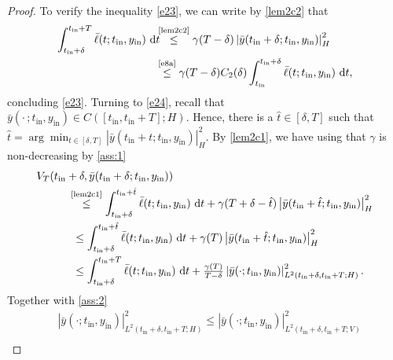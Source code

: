 \documentclass{m2an}
\newcommand{\argmin}{\arg\!\min}
\newcommand{\dt}{\mathrm{d}t}
\newcommand{\tint}{t_{\mathrm{in}}}
\newcommand{\yint}{y_{\mathrm{in}}}
\newcommand{\norm}[2]{\left|#1\right|_{#2}}
\providecommand{\argmin}{\operatorname*{argmin}}
\begin{document}
\begin{proof}
    To verify the inequality \eqref{e23}, we can write by \eqref{lem2c2} that 
    \begin{equation}
        \begin{split}
            \int^{ \tint+T}_{\tint+\delta} \bar \ell(t;\tint, \yint)\ \dt  &\hspace{-1.5mm}   \stackrel{\text{\eqref{lem2c2}}}{\leq} 
            \gamma(T-\delta) \norm{\bar y(\tint+\delta;\tint, \yint)}{H}^2 \\
            &\hspace{-1.5mm}   \stackrel{\text{\eqref{e8a}}}{\leq} \gamma(T-\delta)C_2(\delta) \int_{ \tint}^{\tint+\delta} \bar \ell(t;\tint, \yint)\ \dt,
        \end{split}
    \end{equation}
    concluding \eqref{e23}. Turning to \eqref{e24}, recall that $ \bar y(\cdot\,;\tint, \yint) \in C([\tint,\tint+T];H)$. Hence, there is a $\hat{t}\in [\delta, T]$ such that $\hat{t}= \argmin_{t \in [\delta, T]}  \norm{\bar y(\tint+t ;\tint, \yint)}{H}^2$. By \eqref{lem2c1}, we have using that $\gamma$ is non-decreasing by \cref{ass:1}
    \begin{equation}
        \label{e15}
        \begin{split}
        &V_T( \tint+\delta, \bar y(\tint+\delta; \tint, \yint))\\
        &\hspace{10mm}\stackrel{\text{\eqref{lem2c1}}}{\leq}\int^{\tint+\hat{t}}_{\tint+\delta} \bar \ell(t; \tint, \yint)\ \dt+\gamma(T+\delta-\hat{t}) \norm{ \bar y(\tint+\hat{t}; \tint, \yint)}{H}^2\\
        &\hspace{11.5mm}\leq \int^{\tint+\hat{t}}_{ \tint+\delta} \bar \ell(t;\tint, \yint)\ \dt+\gamma(T)\norm{\bar y(\tint+\hat t;\tint, \yint)}{H}^2\\
        &\hspace{11.5mm}\leq \int^{\tint+T}_{\tint+\delta} \bar \ell(t;\tint, \yint)\ \dt+\tfrac{\gamma(T)}{T-\delta}\norm{\bar y(\cdot;\tint, \yint)}{L^2(\tint+\delta,\tint+T;H)}^2.
        \end{split}
    \end{equation}
    Together with \cref{ass:2}
    \begin{align*}
        &\norm{\bar y(\cdot;\tint, \yint)}{L^2(\tint+\delta,\tint+T;H)}^2\leq \norm{\bar y(\cdot;\tint, \yint)}{{L^2(\tint+\delta,\tint+T;V)}}^2\\

\end{align*}
\end{proof}
\end{document}
